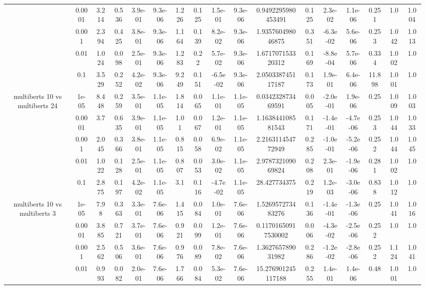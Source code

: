 \begin{tabular}{|c|c|c|c|c|c|c|c|c|c|c|c|c|c|c|c|c|}
 & 0.0001 & 3.214 & 0.536 & 3.9e-01 & 9.3e-06 & 1.226 & 0.125 & 1.5e-01 & 9.3e-06 & 0.9492295980453491 & 0.125 & 2.3e-02 & 1.1e-06 & 0.251 & 1.0 & 1.004 \\
 & 0.001 & 2.394 & 0.425 & 3.8e-01 & 9.3e-06 & 1.164 & 0.139 & 8.2e-02 & 9.3e-06 & 1.935760498046875 & 0.351 & -6.3e-02 & 5.6e-06 & 0.253 & 1.042 & 1.013 \\
 & 0.01 & 1.024 & 0.098 & 2.5e-01 & 9.3e-06 & 1.283 & 0.22 & 5.7e-02 & 9.3e-06 & 1.671707153320312 & 0.169 & -8.8e-04 & 5.7e-06 & 0.334 & 1.002 & 1.0 \\
 & 0.1 & 3.529 & 0.252 & 4.2e-02 & 9.3e-06 & 9.249 & 0.151 & -6.5e-02 & 9.3e-06 & 2.050338745117187 & 0.173 & 1.9e-01 & 6.4e-06 & 11.898 & 1.001 & 1.0 \\
\hline
\multirow{5}{*}{multiberts 10 vs multiberts 24} & 1e-05 & 8.448 & 0.259 & 3.5e-01 & 1.1e-05 & 1.814 & 0.065 & 1.1e-01 & 1.1e-05 & 0.034232873469591 & 0.005 & -2.0e-01 & 1.9e-06 & 0.25 & 1.009 & 1.003 \\
 & 0.0001 & 3.7 & 0.635 & 3.9e-01 & 1.1e-05 & 1.01 & 0.067 & 1.2e-01 & 1.1e-05 & 1.163844108581543 & 0.171 & -1.4e-01 & -4.7e-06 & 0.253 & 1.044 & 1.033 \\
 & 0.001 & 2.045 & 0.366 & 3.8e-01 & 1.1e-05 & 0.815 & 0.058 & 6.9e-02 & 1.1e-05 & 2.216311454772949 & 0.285 & -1.0e-01 & -5.2e-06 & 0.252 & 1.044 & 1.045 \\
 & 0.01 & 1.022 & 0.128 & 2.5e-01 & 1.1e-05 & 0.807 & 0.053 & 3.0e-02 & 1.1e-05 & 2.978732109069824 & 0.208 & 2.3e-01 & -1.9e-06 & 0.281 & 1.002 & 1.0 \\
 & 0.1 & 2.875 & 0.197 & 4.2e-02 & 1.1e-05 & 3.1 & 0.116 & -4.7e-02 & 1.1e-05 & 28.427734375 & 0.219 & 1.2e-03 & -3.0e-06 & 0.838 & 1.012 & 1.0 \\
\hline
\multirow{5}{*}{multiberts 10 vs multiberts 3} & 1e-05 & 7.98 & 0.363 & 3.3e-01 & 7.6e-06 & 1.415 & 0.084 & 1.0e-01 & 7.6e-06 & 1.526957273483276 & 0.136 & -1.4e-01 & -1.3e-06 & 0.25 & 1.041 & 1.016 \\
 & 0.0001 & 3.885 & 0.721 & 3.7e-01 & 7.6e-06 & 0.921 & 0.099 & 1.2e-01 & 7.6e-06 & 0.11701650917530002 & 0.006 & -4.3e-02 & -2.5e-06 & 0.252 & 1.0 & 1.0 \\
 & 0.001 & 2.562 & 0.506 & 3.6e-01 & 7.6e-06 & 0.976 & 0.089 & 7.8e-02 & 7.6e-06 & 1.362765789031982 & 0.286 & -1.2e-02 & -2.8e-06 & 0.252 & 1.124 & 1.041 \\
 & 0.01 & 0.993 & 0.082 & 2.0e-01 & 7.6e-06 & 1.766 & 0.084 & 5.3e-02 & 7.6e-06 & 15.276901245117188 & 0.255 & 1.4e-01 & 1.4e-06 & 0.48 & 1.001 & 1.0 \\

\end{tabular}
